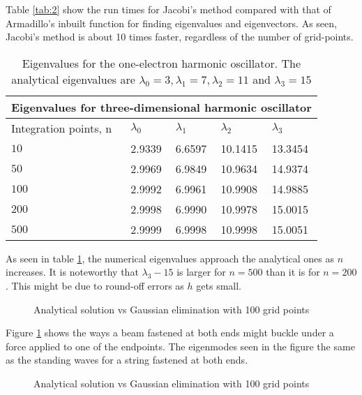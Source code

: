 \documentclass[a4paper,11pt]{article}
\begin{document}
Table \ref{tab:2} show the run times for Jacobi's method compared with that of Armadillo's inbuilt function for finding eigenvalues and eigenvectors. As seen, Jacobi's method is about 10 times faster, regardless of the number of grid-points. 



\begin{table}[H]
    \centering
    \begin{tabular}{|p{3cm}||p{1.5cm}|p{1.5cm}|p{1.5cm}|p{1.5cm}|}
    \hline
    \multicolumn{5}{|c|}{Eigenvalues for three-dimensional harmonic oscillator}\\
    \hline
     Integration points, n & $\lambda_0$ & $\lambda_1$ & $\lambda_2$ & $\lambda_3$\\
    \hline
     $10$   & 2.9339  & 6.6597 & 10.1415 & 13.3454\\
     $50$ & 2.9969 & 6.9849 & 10.9634 & 14.9374  \\
     $100$ & 2.9992 & 6.9961 & 10.9908 & 14.9885\\
     $200$ & 2.9998 & 6.9990 & 10.9978 & 15.0015\\
     $500$ & 2.9999 & 6.9998 & 10.9998 & 15.0051 \\

    \hline
    \end{tabular}
    \caption{Eigenvalues for the one-electron harmonic oscillator. The analytical eigenvalues are $\lambda_0=3, \lambda_1 = 7, \lambda_2 = 11$ and $\lambda_3 = 15$}
    \label{tab:3}
\end{table}

As seen in table \ref{tab:3}, the numerical eigenvalues approach the analytical ones as $n$ increases. It is noteworthy that $\lambda_3 - 15$ is larger for $n=500$ than it is for $n=200$. This might be due to round-off errors as $h$ gets small. 

\begin{figure}[H]
%
  \caption{Analytical solution vs Gaussian elimination with 100 grid points}
  \label{fig:2}
\end{figure}

Figure \ref{fig:2} shows the ways a beam fastened at both ends might buckle under a force applied to one of the endpoints. The eigenmodes seen in the figure the same as the standing waves for a string fastened at both ends. 

\begin{figure}[H]
%
  \caption{Analytical solution vs Gaussian elimination with 100 grid points}
  \label{fig:3}
\end{figure}
\end{document}
